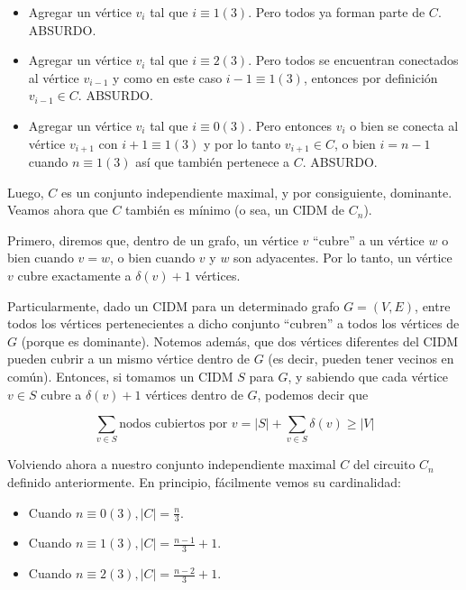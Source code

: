 \begin{itemize}
	\item Agregar un vértice $v_i$ tal que $i \equiv 1 (3)$.  Pero todos ya forman parte de $C$. ABSURDO.
	\item Agregar un vértice $v_i$ tal que $i \equiv 2 (3)$.  Pero todos se encuentran conectados al vértice $v_{i-1}$ y como en este caso $i-1 \equiv 1(3)$, entonces por definición $v_{i-1} \in C$. ABSURDO.
	\item Agregar un vértice $v_i$ tal que $i \equiv 0 (3)$.  Pero entonces $v_i$ o bien se conecta al vértice $v_{i+1}$ con $i+1 \equiv 1 (3)$ y por lo tanto $v_{i+1} \in C$, o bien $i = n-1$ cuando $n \equiv 1 (3)$ así que también pertenece a $C$. ABSURDO.
\end{itemize}

Luego, $C$ es un conjunto independiente maximal, y por consiguiente, dominante. Veamos ahora que $C$ también es mínimo (o sea, un CIDM de $C_n$).

Primero, diremos que, dentro de un grafo, un vértice $v$ ``cubre'' a un vértice $w$ o bien cuando $v = w$, o bien cuando $v$ y $w$ son adyacentes. Por lo tanto, un vértice $v$ cubre exactamente a $\delta(v) + 1$ vértices.

Particularmente, dado un CIDM para un determinado grafo $G = (V,E)$, entre todos los vértices pertenecientes a dicho conjunto ``cubren'' a todos los vértices de $G$ (porque es dominante). Notemos además, que dos vértices diferentes del CIDM pueden cubrir a un mismo vértice dentro de $G$ (es decir, pueden tener vecinos en común). Entonces, si tomamos un CIDM $S$ para $G$, y sabiendo que cada vértice $v \in S$ cubre a $\delta(v) + 1$ vértices dentro de $G$, podemos decir que 

\begin{equation*}
\sum_{v \in S} \text{nodos cubiertos por }v = |S| + \sum_{v \in S} \delta(v) \geq |V|
\end{equation*}

Volviendo ahora a nuestro conjunto independiente maximal $C$ del circuito $C_n$ definido anteriormente. En principio, fácilmente vemos su cardinalidad:

\begin{itemize}
	\item Cuando $n \equiv 0 (3), |C| = \frac{n}{3}$.
	\item Cuando $n \equiv 1 (3), |C| = \frac{n-1}{3} + 1$.	
	\item Cuando $n \equiv 2 (3), |C| = \frac{n-2}{3} + 1$.	
\end{itemize}

